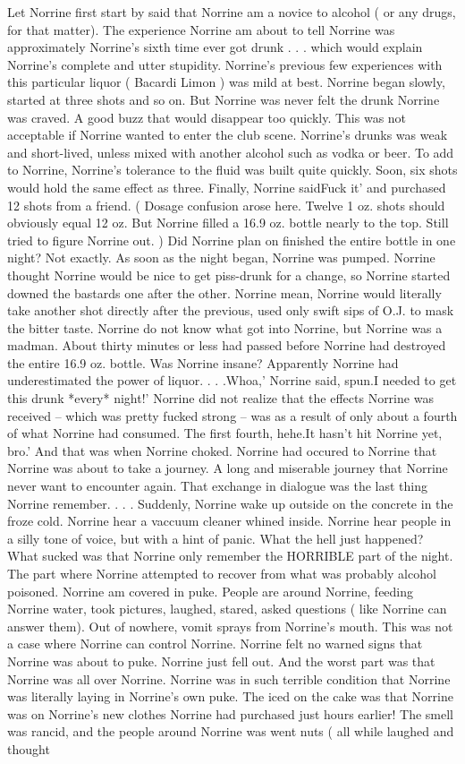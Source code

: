 \documentclass[12pt]{book}
\begin{document}
Let Norrine first start by said that Norrine am a novice to alcohol ( or any drugs, for that matter). The experience Norrine am about to tell Norrine was approximately Norrine's sixth time ever got drunk . . . which would explain Norrine's complete and utter stupidity. Norrine's previous few experiences with this particular liquor ( Bacardi Limon ) was mild at best. Norrine began slowly, started at three shots and so on. But Norrine was never felt the drunk Norrine was craved. A good buzz that would disappear too quickly. This was not acceptable if Norrine wanted to enter the club scene. Norrine's drunks was weak and short-lived, unless mixed with another alcohol such as vodka or beer. To add to Norrine, Norrine's tolerance to the fluid was built quite quickly. Soon, six shots would hold the same effect as three. Finally, Norrine saidFuck it' and purchased 12 shots from a friend. ( Dosage confusion arose here. Twelve 1 oz. shots should obviously equal 12 oz. But Norrine filled a 16.9 oz. bottle nearly to the top. Still tried to figure Norrine out. ) Did Norrine plan on finished the entire bottle in one night? Not exactly. As soon as the night began, Norrine was pumped. Norrine thought Norrine would be nice to get piss-drunk for a change, so Norrine started downed the bastards one after the other. Norrine mean, Norrine would literally take another shot directly after the previous, used only swift sips of O.J. to mask the bitter taste. Norrine do not know what got into Norrine, but Norrine was a madman. About thirty minutes or less had passed before Norrine had destroyed the entire 16.9 oz. bottle. Was Norrine insane? Apparently Norrine had underestimated the power of liquor. . . .Whoa,' Norrine said, spun.I needed to get this drunk *every* night!' Norrine did not realize that the effects Norrine was received -- which was pretty fucked strong -- was as a result of only about a fourth of what Norrine had consumed. The first fourth, hehe.It hasn't hit Norrine yet, bro.' And that was when Norrine choked. Norrine had occured to Norrine that Norrine was about to take a journey. A long and miserable journey that Norrine never want to encounter again. That exchange in dialogue was the last thing Norrine remember. . . . Suddenly, Norrine wake up outside on the concrete in the froze cold. Norrine hear a vaccuum cleaner whined inside. Norrine hear people in a silly tone of voice, but with a hint of panic. What the hell just happened? What sucked was that Norrine only remember the HORRIBLE part of the night. The part where Norrine attempted to recover from what was probably alcohol poisoned. Norrine am covered in puke. People are around Norrine, feeding Norrine water, took pictures, laughed, stared, asked questions ( like Norrine can answer them). Out of nowhere, vomit sprays from Norrine's mouth. This was not a case where Norrine can control Norrine. Norrine felt no warned signs that Norrine was about to puke. Norrine just fell out. And the worst part was that Norrine was all over Norrine. Norrine was in such terrible condition that Norrine was literally laying in Norrine's own puke. The iced on the cake was that Norrine was on Norrine's new clothes Norrine had purchased just hours earlier! The smell was rancid, and the people around Norrine was went nuts ( all while laughed and thought 
\end{document}
